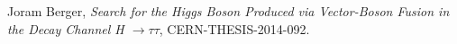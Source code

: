  \begin{thebibliography}{99}

    Joram Berger,
      \textit{Search for the Higgs Boson Produced via Vector-Boson
                        Fusion in the Decay Channel H $\to \tau \tau$},
      CERN-THESIS-2014-092.
      
\end{thebibliography}
